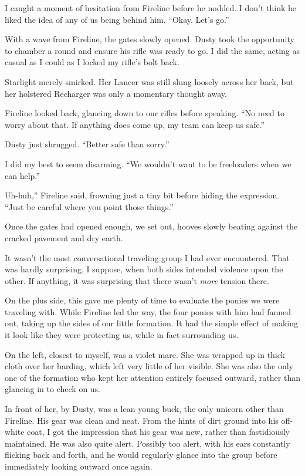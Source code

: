 I caught a moment of hesitation from Fireline before he nodded. I don’t think he liked the idea of any of us being behind him. “Okay. Let’s go.”

With a wave from Fireline, the gates slowly opened. Dusty took the opportunity to chamber a round and ensure his rifle was ready to go. I did the same, acting as casual as I could as I locked my rifle’s bolt back.

Starlight merely smirked. Her Lancer was still slung loosely across her back, but her holstered Recharger was only a momentary thought away.

Fireline looked back, glancing down to our rifles before speaking. “No need to worry about that. If anything does come up, my team can keep us safe.”

Dusty just shrugged. “Better safe than sorry.”

I did my best to seem disarming. “We wouldn’t want to be freeloaders when we can help.”

\leavevmode{}Uh-huh,” Fireline said, frowning just a tiny bit before hiding the expression. “Just be careful where you point those things.”

Once the gates had opened enough, we set out, hooves slowly beating against the cracked pavement and dry earth.

It wasn’t the most conversational traveling group I had ever encountered. That was hardly surprising, I suppose, when both sides intended violence upon the other. If anything, it was surprising that there wasn’t \textit{more} tension there.

On the plus side, this gave me plenty of time to evaluate the ponies we were traveling with. While Fireline led the way, the four ponies with him had fanned out, taking up the sides of our little formation. It had the simple effect of making it look like they were protecting us, while in fact surrounding us.

On the left, closest to myself, was a violet mare. She was wrapped up in thick cloth over her barding, which left very little of her visible. She was also the only one of the formation who kept her attention entirely focused outward, rather than glancing in to check on us.

In front of her, by Dusty, was a lean young buck, the only unicorn other than Fireline. His gear was clean and neat. From the hints of dirt ground into his off-white coat, I got the impression that his gear was new, rather than fastidiously maintained. He was also quite alert. Possibly too alert, with his ears constantly flicking back and forth, and he would regularly glance into the group before immediately looking outward once again.

